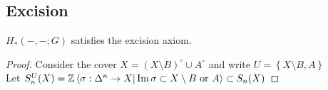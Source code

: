 \documentclass[../main.tex]{subfiles}
\begin{document}
\subsection{Excision}
\begin{propo}
$H_\ast( -,-;G) $ satisfies the excision axiom.
\end{propo}
\begin{proof}
Consider the cover $X= ( X\setminus B)^{\circ}\cup A^{\circ}$ and write $U = \left\{ X\setminus B, A \right\} $ \\
Let $S_n^{U}( X) =  \mathbb{Z} \left\langle\sigma:\Delta^{n}\to X | \operatorname{Im}\sigma \subset X\setminus B \text{ or } A \right\rangle \subset S_n( X) $ 
\end{proof}


		
	
\end{document}
